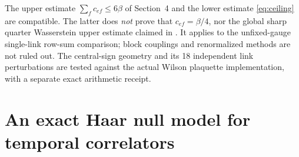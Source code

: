 \documentclass[11pt,a4paper]{article}
\numberwithin{equation}{section}
\begin{document}
The upper estimate \(\sum_f c_{ef}\leq6\beta\) of
Section~4 and the lower estimate \eqref{eq:ceiling}
are compatible. The latter does \emph{not} prove that
\(c_{ef}=\beta/4\), nor the global sharp quarter
Wasserstein upper estimate claimed in
\cite{BhattacharjeeBhattacharya}. It applies to the
unfixed-gauge single-link row-sum comparison; block couplings
and renormalized methods are not ruled out. The central-sign
geometry and its 18 independent link perturbations are tested
against the actual Wilson plaquette implementation, with a
separate exact arithmetic receipt.

\section{An exact Haar null model for temporal correlators}
\label{sec:haar}
\end{document}
